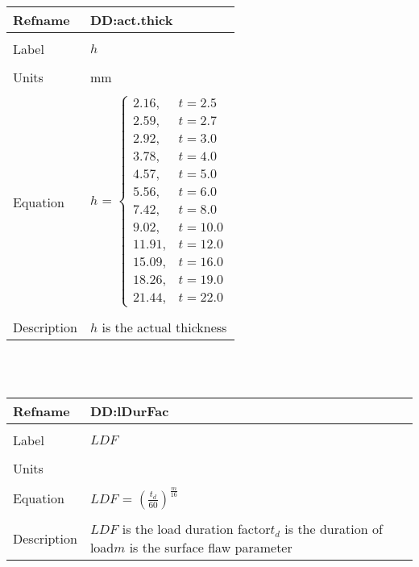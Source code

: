 \documentclass[12pt]{article}
\begin{document}
\noindent \begin{minipage}{\textwidth}
\begin{tabular}{p{} p{}}
\toprule \textbf{Refname} & \textbf{DD:act.thick}
\label{DD:act.thick}
\\ \midrule \\
Label & $h$
\\ \midrule \\
Units & mm
\\ \midrule \\
Equation & $h$ = $\begin{cases}
2.16, & t=2.5\\
2.59, & t=2.7\\
2.92, & t=3.0\\
3.78, & t=4.0\\
4.57, & t=5.0\\
5.56, & t=6.0\\
7.42, & t=8.0\\
9.02, & t=10.0\\
11.91, & t=12.0\\
15.09, & t=16.0\\
18.26, & t=19.0\\
21.44, & t=22.0
\end{cases}$
\\ \midrule \\
Description & $h$ is the actual thickness
\\ \bottomrule \end{tabular}
\end{minipage}\\
~\newline
\noindent \begin{minipage}{\textwidth}
\begin{tabular}{p{} p{}}
\toprule \textbf{Refname} & \textbf{DD:lDurFac}
\label{DD:lDurFac}
\\ \midrule \\
Label & $LDF$
\\ \midrule \\
Units & 
\\ \midrule \\
Equation & $LDF$ = $(\frac{t_{d}}{60})^{\frac{m}{16}}$
\\ \midrule \\
Description & $LDF$ is the load duration factor\newline$t_{d}$ is the duration of load\newline$m$ is the surface flaw parameter
\\ \bottomrule \end{tabular}
\end{minipage}\\
\end{document}
